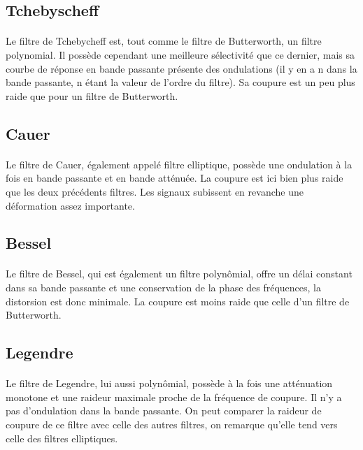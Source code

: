 \documentclass[a4paper,11pt]{article}
\begin{document}
    \subsection{Tchebyscheff}
        \paragraph{}
Le filtre de Tchebycheff est, tout comme le filtre de Butterworth, un filtre polynomial.
Il possède cependant une meilleure sélectivité que ce dernier, mais sa courbe de réponse en bande passante présente des ondulations (il y en a n dans la bande passante, n étant la valeur de l'ordre du filtre).
Sa coupure est un peu plus raide que pour un filtre de Butterworth.

    \subsection{Cauer}
        \paragraph{}
Le filtre de Cauer, également appelé filtre elliptique, possède une ondulation à la fois en bande passante et en bande atténuée.
La coupure est ici bien plus raide que les deux précédents filtres.
Les signaux subissent en revanche une déformation assez importante.

    \subsection{Bessel}
        \paragraph{}
Le filtre de Bessel, qui est également un filtre polynômial, offre un délai constant dans sa bande passante et une conservation de la phase des fréquences, la distorsion est donc minimale.
La coupure est moins raide que celle d’un filtre de Butterworth.

    \subsection{Legendre}
        \paragraph{}
Le filtre de Legendre, lui aussi polynômial, possède à la fois une atténuation monotone et une raideur maximale proche de la fréquence de coupure.
Il n’y a pas d’ondulation dans la bande passante.
On peut comparer la  raideur de coupure de ce filtre avec celle des autres filtres, on remarque qu’elle tend vers celle des filtres elliptiques.
\end{document}
